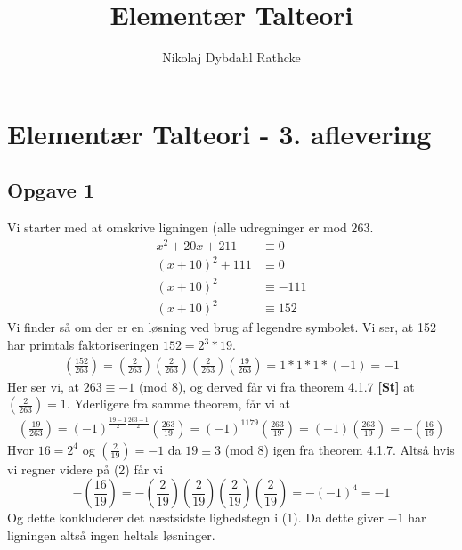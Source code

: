 \documentclass[12pt]{article}
\title{Elementær Talteori}
\author{Nikolaj Dybdahl Rathcke}
\begin{document}
\section*{Elementær Talteori - 3. aflevering}

\subsection*{Opgave 1}
Vi starter med at omskrive ligningen (alle udregninger er mod $263$.
\begin{align*}
x^2 + 20x + 211 &\equiv 0\\
(x+10)^2+111&\equiv 0\\
(x+10)^2&\equiv -111 \\
(x+10)^2&\equiv 152
\end{align*}
Vi finder så om der er en løsning ved brug af legendre symbolet. Vi ser, at 152 har primtals faktoriseringen $152= 2^3*19$.
\begin{align}
(\frac{152}{263})=(\frac{2}{263})(\frac{2}{263})(\frac{2}{263})(\frac{19}{263})=1*1*1*(-1)=-1
\end{align}
Her ser vi, at $263\equiv -1$ (mod $8$), og derved får vi fra theorem 4.1.7 \textbf{[St]} at $(\frac{2}{263})=1$. Yderligere fra samme theorem, får vi at
\begin{align}
(\frac{19}{263})=(-1)^{\frac{19-1}{2}\frac{263-1}{2}}(\frac{263}{19})=(-1)^{1179}(\frac{263}{19})=(-1)(\frac{263}{19})=-(\frac{16}{19})
\end{align}
Hvor $16=2^4$ og $(\frac{2}{19})=-1$ da $19\equiv 3$ (mod $8$) igen fra theorem 4.1.7. Altså hvis vi regner videre på (2) får vi
$$-(\frac{16}{19})=-(\frac{2}{19})(\frac{2}{19})(\frac{2}{19})(\frac{2}{19})=-(-1)^4=-1$$
Og dette konkluderer det næstsidste lighedstegn i (1). Da dette giver $-1$ har ligningen altså ingen heltals løsninger.
\end{document}
